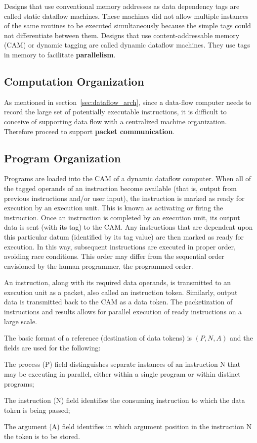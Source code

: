\documentclass[UTF8,12pt,a4paper]{article}
\begin{document}
Designs that use conventional memory addresses as data dependency tags are called static dataflow machines.
These machines did not allow multiple instances of the same routines to be executed simultaneously
because the simple tags could not differentiate between them.
Designs that use content-addressable memory (CAM) or dynamic tagging are called dynamic dataflow machines.
They use tags in memory to facilitate \textbf{parallelism}.

\subsection{Computation Organization}
As mentioned in section~\ref{sec:dataflow_arch},
since a data-flow computer needs to record
the large set of potentially executable instructions,
it is difficult to conceive of supporting
data flow with a centralized machine organization.
Therefore proceed to support \textbf{packet communication}.

\subsection{Program Organization}
Programs are loaded into the CAM of a dynamic dataflow computer.
When all of the tagged operands of an instruction become available (that is, output from previous instructions and/or user input),
the instruction is marked as ready for execution by an execution unit.
This is known as activating or firing the instruction.
Once an instruction is completed by an execution unit,
its output data is sent (with its tag) to the CAM.
Any instructions that are dependent upon this particular datum (identified by its tag value)
are then marked as ready for execution.
In this way, subsequent instructions are executed in proper order, avoiding race conditions.
This order may differ from the sequential order envisioned by the human programmer, the programmed order.

An instruction, along with its required data operands,
is transmitted to an execution unit as a packet, also called an instruction token.
Similarly, output data is transmitted back to the CAM as a data token.
The packetization of instructions and results allows for parallel execution of ready instructions on a large scale.

The basic format of a reference (destination of data tokens) is $(P, N, A)$
and the fields are used for the following:
\begin{compactitem}
  \item The process (P) field distinguishes separate instances
        of an instruction N that may be executing in parallel,
        either within a single program or within distinct programs;
  \item The instruction (N) field identifies the consuming instruction
        to which the data token is being passed;
  \item The argument (A) field identifies in which
        argument position in the instruction N the token is to be stored. 
\end{compactitem}
\end{document}
